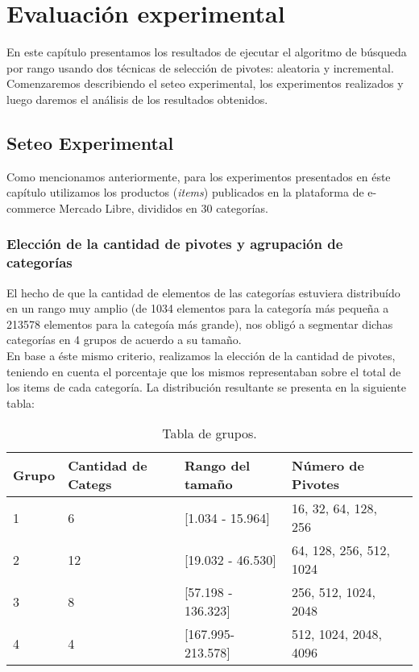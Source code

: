 \chapter{Evaluaci\'on experimental}

En este cap\'itulo presentamos los resultados de ejecutar el algoritmo de b\'usqueda por rango usando dos t\'ecnicas de selecci\'on de pivotes: aleatoria y incremental.\\

Comenzaremos describiendo el seteo experimental, los experimentos realizados y luego daremos el an\'alisis de los resultados obtenidos.\\

\section{Seteo Experimental}

Como mencionamos anteriormente, para los experimentos presentados en \'este cap\'itulo utilizamos los productos (\textit{items}) publicados en la plataforma de e-commerce Mercado Libre, divididos en 30 categor\'ias.\\

\subsection{Elecci\'on de la cantidad de pivotes y agrupaci\'on de categor\'ias}
El hecho de que la cantidad de elementos de las categor\'ias estuviera distribu\'ido en un rango muy amplio (de 1034 elementos para la categor\'ia m\'as peque\~na a 213578 elementos para la catego\'ia m\'as grande), nos oblig\'o a segmentar dichas categor\'ias en 4 grupos de acuerdo a su tamaño.\\

En base a \'este mismo criterio, realizamos la elecci\'on de la cantidad de pivotes, teniendo en cuenta el porcentaje que los mismos representaban sobre el total de los items de cada categor\'ia. La distribuci\'on resultante se presenta en la siguiente tabla:\\

\begin{table}[htbp]
\begin{center}
\begin{tabular}{|p{1.1cm}|p{1.8cm}|p{3.2cm}|p{2.2cm}|p{2.5cm}|}
\hline
Grupo & 
Cantidad de Categs & 
Rango del tama\~no & 
N\'umero de Pivotes \\
\hline \hline
1 & 
6 & 
[1.034 - 15.964] & 
16, 32, 64, 128, 256  \\ \hline
2 &
12 &
[19.032 - 46.530] &
64, 128, 256, 512, 1024  \\ \hline
3 &
8 &
[57.198 - 136.323] &
256, 512, 1024, 2048  \\ \hline
4 &
4 &
[167.995- 213.578] &
512, 1024, 2048, 4096  \\ \hline
\end{tabular}
\caption{Tabla de grupos.}
\label{tabla:grupos}
\end{center}
\end{table}


